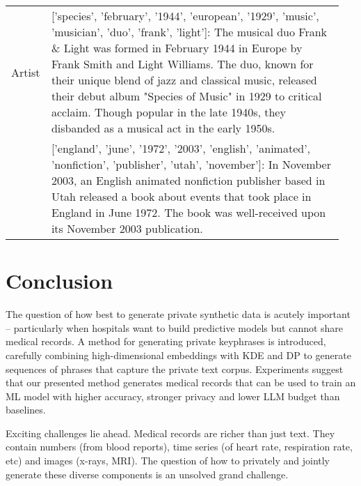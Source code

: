 \begin{table*}
{\begin{centering}
\begin{tabular}{p{0.08\linewidth}p{0.87\linewidth}}
Artist &

['species', 'february', '1944', 'european', '1929', 'music', 'musician', 'duo', 'frank', 'light']: \newline 
\textcolor{goodgreen}{The musical duo Frank \& Light was formed in February 1944 in Europe by Frank Smith and Light Williams. The duo, known for their unique blend of jazz and classical music, released their debut album "Species of Music" in 1929 to critical acclaim. Though popular in the late 1940s, they disbanded as a musical act in the early 1950s.} \\

& ['england', 'june', '1972', '2003', 'english', 'animated', 'nonfiction', 'publisher', 'utah', 'november']: \newline 
\textcolor{badred}{In November 2003, an English animated nonfiction publisher based in Utah released a book about events that took place in England in June 1972. The book was well-received upon its November 2003 publication. }\\








\bottomrule
\end{tabular}
\end{centering}}
\end{table*}


\section{Conclusion}
The question of how best to generate private synthetic data is acutely important -- particularly when hospitals want to build predictive models but cannot share medical records.  A method for generating private keyphrases is introduced, carefully combining high-dimensional embeddings with KDE and DP to generate sequences of phrases that capture the private text corpus. Experiments suggest that our presented method generates medical records that can be used to train an ML model with higher accuracy, stronger privacy and lower LLM budget than baselines. 

Exciting challenges lie ahead.  Medical records are richer than just text.  They contain numbers (from blood reports), time series (of heart rate, respiration rate, etc) and images (x-rays, MRI).  The question of how to privately and jointly generate these diverse components is an unsolved grand challenge.




